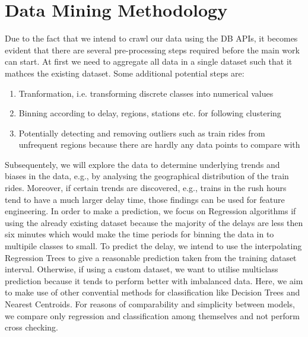 \documentclass[a4paper,oneside,bibliography=totoc]{scrbook}
\begin{document}
\section{Data Mining Methodology}\label{sec:data-mining-methodology}
Due to the fact that we intend to crawl our data using the DB APIs, it becomes evident that there are several pre-processing steps required before the main work can start. At first we need to aggregate all data in a single dataset such that it mathces the existing dataset.
Some additional potential steps are:
\begin{enumerate}
    \item Tranformation, i.e. transforming discrete classes into numerical values
    \item Binning according to delay, regions, stations etc. for following clustering
    \item Potentially detecting and removing outliers such as train rides from unfrequent regions because there are hardly any data points to compare with
\end{enumerate}
Subsequentely, we will explore the data to determine underlying trends and biases in the data, e.g., by analysing the geographical distribution of the train rides. Moreover, if certain trends are discovered, e.g., trains in the rush hours tend to have a much larger delay time, those findings can be used for feature engineering.
In order to make a prediction, we focus on Regression algorithms if using the already existing dataset because the majority of the delays are less then six minutes which would make the time periods for binning the data in to multipile classes to small. To predict the delay, we intend to
use the interpolating Regression Trees to give a reasonable prediction taken from the training dataset interval. Otherwise, if using a custom dataset, we want to utilise multiclass prediction because it tends to perform better with imbalanced data. Here, we aim to make use of other convential methods for classification like Decision Trees and Nearest Centroids. For reasons of comparability and simplicity between models, we compare only regression and classification
among themselves and not perform cross checking.
\end{document}
